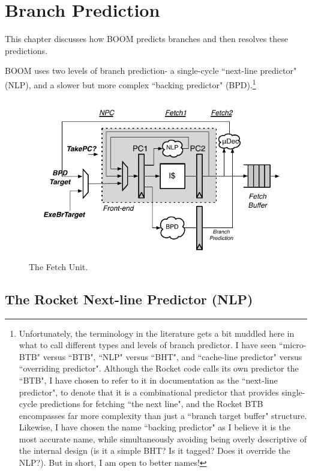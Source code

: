  
\chapter{Branch Prediction}\label{chapter:bpd}

This chapter discusses how BOOM predicts branches and then resolves these predictions.

BOOM uses two levels of branch prediction- a single-cycle ``next-line predictor" (NLP), and a slower but more complex ``backing predictor" (BPD).\footnote{Unfortunately, the terminology in the literature gets a bit muddled here in what to call different types and levels of branch predictor. I have seen ``micro-BTB" versus ``BTB", ``NLP" versus ``BHT", and ``cache-line predictor" versus ``overriding predictor". 
Although the Rocket code calls its own predictor the ``BTB", I have chosen to refer to it in documentation as the ``next-line predictor", to denote that it is a combinational predictor that provides single-cycle predictions for fetching ``the next line", and the Rocket BTB encompasses far more complexity than just a ``branch target buffer" structure.  Likewise, I have chosen the name ``backing predictor" as I believe it is the most accurate name, while simultaneously avoiding being overly descriptive of the internal design (is it a simple BHT? Is it tagged? Does it override the NLP?).
{\color{red} But in short, I am open to better names!}}



\begin{figure}[ht]
	\centering
	\centerline{\includegraphics[scale =1] {figures/frontend}}
	\caption{ \small The Fetch Unit.}
	\label{fig:fetch}
\end{figure}


\section{The Rocket Next-line Predictor (NLP)}

